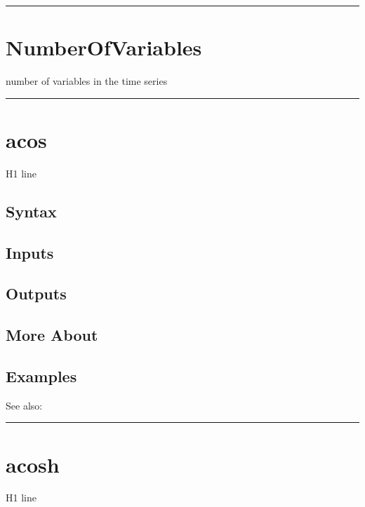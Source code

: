 \documentclass[letterpaper,10pt,english]{sphinxmanual}
\begin{document}
\bigskip\hrule{}\bigskip



\section{NumberOfVariables}
\label{classes/time_series/@ts/ts:id3}\label{classes/time_series/@ts/ts:numberofvariables}
number of variables in the time series


\bigskip\hrule{}\bigskip



\section{acos}
\label{classes/time_series/@ts/ts:acos}\label{classes/time_series/@ts/ts:id4}
H1 line


\subsection{Syntax}
\label{classes/time_series/@ts/ts:syntax}

\subsection{Inputs}
\label{classes/time_series/@ts/ts:inputs}

\subsection{Outputs}
\label{classes/time_series/@ts/ts:outputs}

\subsection{More About}
\label{classes/time_series/@ts/ts:more-about}

\subsection{Examples}
\label{classes/time_series/@ts/ts:examples}
See also:


\bigskip\hrule{}\bigskip



\section{acosh}
\label{classes/time_series/@ts/ts:id5}\label{classes/time_series/@ts/ts:acosh}
H1 line
\end{document}
